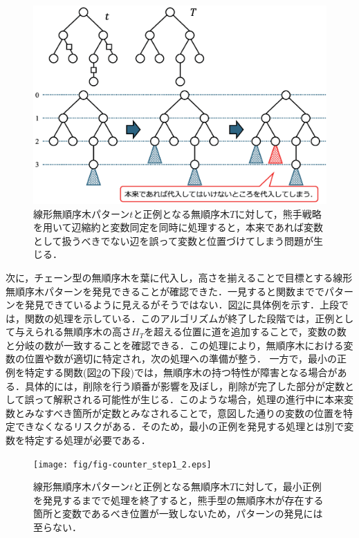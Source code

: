 \begin{figure}[tb]
  \centering
  \includegraphics[scale=0.6]{fig/fig-counter_leaf_to_rake.eps}
  \caption{線形無順序木パターン$t$と正例となる無順序木$T$に対して，熊手戦略を用いて辺縮約と変数同定を同時に処理すると，本来であれば変数として扱うべきでない辺を誤って変数と位置づけてしまう問題が生じる．}\label{fig:counter_leaf_to_rake}
\end{figure}

次に，チェーン型の無順序木を葉に代入し，高さを揃えることで目標とする線形無順序木パターンを発見できることが確認できた．一見すると関数まででパターンを発見できているように見えるがそうではない．図\ref{fig:counter_step1_2}に具体例を示す．上段では，関数の処理を示している．このアルゴリズムが終了した段階では，正例として与えられる無順序木の高さ$H_T$を超える位置に道を追加することで，変数の数と分岐の数が一致することを確認できる．この処理により，無順序木における変数の位置や数が適切に特定され，次の処理への準備が整う．
一方で，最小の正例を特定する関数(図\ref{fig:counter_step1_2}の下段)では，無順序木の持つ特性が障害となる場合がある．具体的には，削除を行う順番が影響を及ぼし，削除が完了した部分が定数として誤って解釈される可能性が生じる．このような場合，処理の進行中に本来変数とみなすべき箇所が定数とみなされることで，意図した通りの変数の位置を特定できなくなるリスクがある．そのため，最小の正例を発見する処理とは別で変数を特定する処理が必要である．

\begin{figure}[tb]
  \centering
  \texttt{[image: fig/fig-counter\_step1\_2.eps]}
  \caption{線形無順序木パターン$t$と正例となる無順序木$T$に対して，最小正例を発見するまでで処理を終了すると，熊手型の無順序木が存在する箇所と変数であるべき位置が一致しないため，パターンの発見には至らない．}\label{fig:counter_step1_2}
\end{figure}

